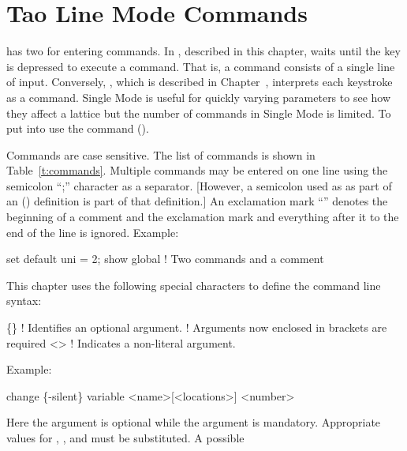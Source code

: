 \chapter{Tao Line Mode Commands}
\label{c:command}

\tao has two  for entering commands. In , described in this
chapter, \tao waits until the  key is depressed to execute a command. That is,
a command consists of a single line of input. Conversely, , which is
described in Chapter~, interprets each keystroke as a command. Single Mode
is useful for quickly varying parameters to see how they affect a lattice but the number
of commands in Single Mode is limited. To put \tao into  use the
 command ().

Commands are case sensitive. The list of commands is shown in
Table~\ref{t:commands}. Multiple commands may be entered on one line using the semicolon
``;'' character as a separator.  [However, a semicolon used as as part of an 
() definition is part of that definition.]  An exclamation mark ``\vn{!}''
denotes the beginning of a comment and the exclamation mark and everything after it to the
end of the line is ignored.  Example:
\begin{example}
  set default uni = 2; show global  ! Two commands and a comment
\end{example}

This chapter uses the following special characters to define the command line syntax:
\begin{example}
  \{\}        ! Identifies an optional argument. 
              !   Arguments now enclosed in brackets are required
  <>        ! Indicates a non-literal argument.
\end{example}

Example:
\begin{example}
  change \{-silent\} variable <name>[<locations>] <number>
\end{example}
Here the  argument is optional while the  argument is
mandatory. Appropriate values for , , and  must be
substituted. A possible


